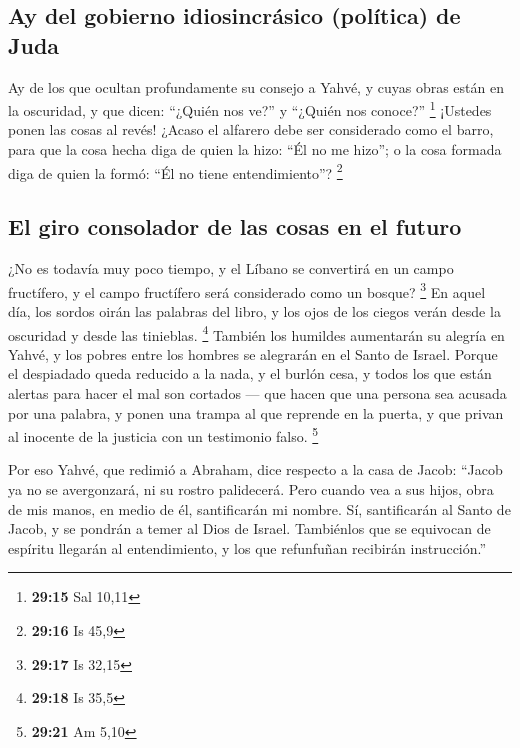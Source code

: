 \begin{paracol}{2}
\hypertarget{ay-del-gobierno-idiosincruxe1sico-poluxedtica-de-juda}{%
\subsection{Ay del gobierno idiosincrásico (política) de
Juda}\label{ay-del-gobierno-idiosincruxe1sico-poluxedtica-de-juda}}

 Ay de los que ocultan profundamente su consejo a Yahvé,
y cuyas obras están en la oscuridad, y que dicen: ``¿Quién nos ve?'' y
``¿Quién nos conoce?'' \footnote{\textbf{29:15} Sal 10,11}
 ¡Ustedes ponen las cosas al revés! ¿Acaso el alfarero
debe ser considerado como el barro, para que la cosa hecha diga de quien
la hizo: ``Él no me hizo''; o la cosa formada diga de quien la formó:
``Él no tiene entendimiento''? \footnote{\textbf{29:16} Is 45,9}

\hypertarget{el-giro-consolador-de-las-cosas-en-el-futuro}{%
\subsection{El giro consolador de las cosas en el
futuro}\label{el-giro-consolador-de-las-cosas-en-el-futuro}}

 ¿No es todavía muy poco tiempo, y el Líbano se
convertirá en un campo fructífero, y el campo fructífero será
considerado como un bosque? \footnote{\textbf{29:17} Is 32,15}
 En aquel día, los sordos oirán las palabras del libro, y
los ojos de los ciegos verán desde la oscuridad y desde las tinieblas.
\footnote{\textbf{29:18} Is 35,5}  También los humildes
aumentarán su alegría en Yahvé, y los pobres entre los hombres se
alegrarán en el Santo de Israel.  Porque el despiadado
queda reducido a la nada, y el burlón cesa, y todos los que están
alertas para hacer el mal son cortados ---  que hacen que
una persona sea acusada por una palabra, y ponen una trampa al que
reprende en la puerta, y que privan al inocente de la justicia con un
testimonio falso. \footnote{\textbf{29:21} Am 5,10}

 Por eso Yahvé, que redimió a Abraham, dice respecto a la
casa de Jacob: ``Jacob ya no se avergonzará, ni su rostro palidecerá.
 Pero cuando vea a sus hijos, obra de mis manos, en medio
de él, santificarán mi nombre. Sí, santificarán al Santo de Jacob, y se
pondrán a temer al Dios de Israel.  Tambiénlos que se
equivocan de espíritu llegarán al entendimiento, y los que refunfuñan
recibirán instrucción.''


\end{paracol}

